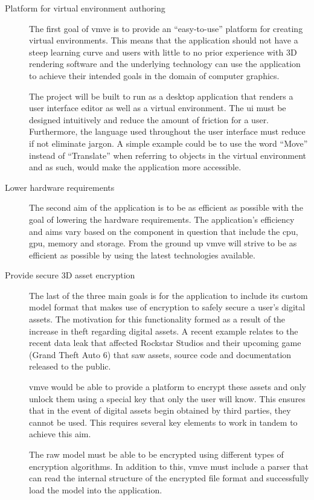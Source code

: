 \documentclass[11pt]{article}
\begin{document}
\begin{description}
  \item[Platform for virtual environment authoring] The first goal of
    \gls*{vmve} is to provide an ``easy-to-use'' platform for creating virtual
    environments. This means that the application should not have a steep
    learning curve and users with little to no prior experience with 3D
    rendering software and the underlying technology can use the application to
    achieve their intended goals in the domain of computer graphics. 

    The project will be built to run as a desktop application that renders a
    user interface editor as well as a virtual environment. The \gls*{ui} must
    be designed intuitively and reduce the amount of friction for a user.
    Furthermore, the language used throughout the user interface must reduce if
    not eliminate jargon. A simple example could be to use the word ``Move''
    instead of ``Translate'' when referring to objects in the virtual
    environment and as such, would make the application more accessible.

  \item[Lower hardware requirements] The second aim of the application is to be
    as efficient as possible with the goal of lowering the hardware
    requirements. The application's efficiency and aims vary based on the
    component in question that include the \gls*{cpu}, \gls*{gpu}, memory and
    storage. From the ground up \gls*{vmve} will strive to be as efficient as
    possible by using the latest technologies available.

  \item[Provide secure 3D asset encryption] The last of the three main goals is
    for the application to include its custom model format that makes use of
    encryption to safely secure a user's digital assets. The motivation for
    this functionality formed as a result of the increase in theft regarding
    digital assets. A recent example relates to the recent data leak that
    affected Rockstar Studios and their upcoming game (Grand Theft Auto 6)
    \cite{gta_leak} that saw assets, source code and documentation released to
    the public.
    
    \gls*{vmve} would be able to provide a platform to encrypt these assets and
    only unlock them using a special key that only the user will know. This
    ensures that in the event of digital assets begin obtained by third parties,
    they cannot be used. This requires several key elements to work in tandem to
    achieve this aim.
    
    The raw model must be able to be encrypted using different types of encryption
    algorithms. In addition to this, \gls*{vmve} must include a parser that can read
    the internal structure of the encrypted file format and successfully load the
    model into the application.
\end{description}
\end{document}
